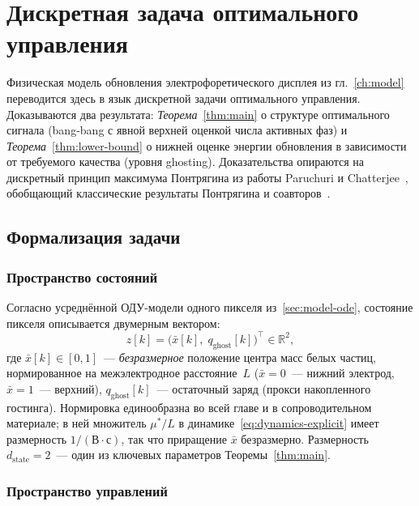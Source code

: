 \chapter{Дискретная задача оптимального управления}\label{ch:theorem}

Физическая модель обновления электрофоретического дисплея из
гл.~\ref{ch:model} переводится здесь в язык дискретной задачи оптимального
управления. Доказываются два результата: \emph{Теорема}~\ref{thm:main}
о структуре оптимального сигнала (bang-bang с явной верхней оценкой числа
активных фаз) и \emph{Теорема}~\ref{thm:lower-bound} о нижней оценке энергии
обновления в зависимости от требуемого качества (уровня ghosting).
Доказательства опираются на дискретный принцип максимума
Понтрягина из работы Paruchuri и
Chatterjee~\cite{paruchuri2019_discrete_pmp}, обобщающий классические
результаты Понтрягина и соавторов~\cite{pontryagin1983_optimal_processes}.


\section{Формализация задачи}\label{sec:theorem-formulation}

\subsection*{Пространство состояний}

Согласно усреднённой ОДУ-модели одного пикселя из~\ref{sec:model-ode}, состояние
пикселя описывается двумерным вектором:
\begin{equation}\label{eq:state}
    z[k] = \bigl(\bar{x}[k],\; q_{\mathrm{ghost}}[k]\bigr)^{\!\top} \in \mathbb{R}^2,
\end{equation}
где $\bar{x}[k] \in [0, 1]$~--- \emph{безразмерное} положение центра масс
белых частиц, нормированное на межэлектродное расстояние~$L$ ($\bar{x} = 0$~---
нижний электрод, $\bar{x} = 1$~--- верхний), $q_{\mathrm{ghost}}[k]$~---
остаточный заряд (прокси накопленного гостинга). Нормировка
единообразна во всей главе и в сопроводительном материале; в ней множитель
$\mu^{*}/L$ в динамике~\eqref{eq:dynamics-explicit} имеет размерность
$1/(\text{В}\cdot\text{с})$, так что приращение $\bar{x}$ безразмерно.
Размерность $d_{\mathrm{state}} = 2$~--- один из ключевых параметров
Теоремы~\ref{thm:main}.

\subsection*{Пространство управлений}

